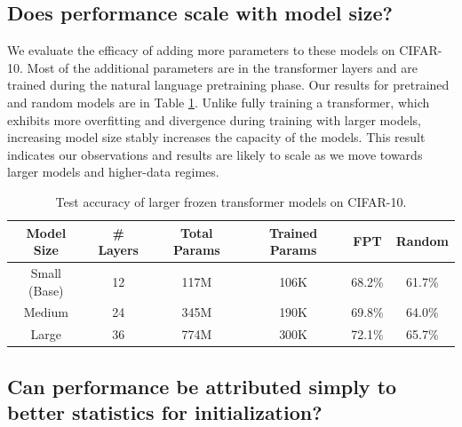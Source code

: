 

\subsection{Does performance scale with model size?}
\label{sec:size}

We evaluate the efficacy of adding more parameters to these models on CIFAR-10.
Most of the additional parameters are in the transformer layers and are trained during the natural language pretraining phase.
Our results for pretrained and random models are in Table \ref{table:larger_models}.
Unlike fully training a transformer, which exhibits more overfitting and divergence during training with larger models, increasing model size stably increases the capacity of the models.
This result indicates our observations and results are likely to scale as we move towards larger models and higher-data regimes.

\begin{table}[h] 
\begin{center}
\begin{tabular}{c|ccc|cc}
\toprule
\textbf{Model Size} & \multicolumn{1}{c}{\bf \# Layers} & \multicolumn{1}{c}{\bf Total Params} & \textbf{Trained Params} & \multicolumn{1}{c}{\bf FPT} & \multicolumn{1}{c}{\bf Random} \\
\midrule
Small (Base) & 12 & 117M & 106K & 68.2\% & 61.7\% \\
Medium       & 24 & 345M & 190K & 69.8\% & 64.0\% \\
Large        & 36 & 774M & 300K & 72.1\% & 65.7\% \\
\bottomrule
\end{tabular}
\end{center}
\caption{Test accuracy of larger frozen transformer models on CIFAR-10.}\label{table:larger_models}
\end{table}

\subsection{Can performance be attributed simply to better statistics for initialization?}
\label{sec:initialization}

